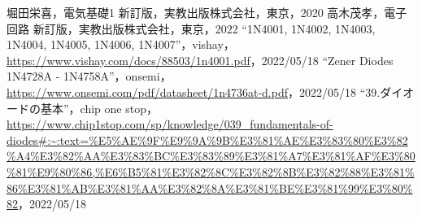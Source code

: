 \begin{thebibliography}{9}%
	 堀田栄喜，電気基礎1 新訂版，実教出版株式会社，東京，2020
	 高木茂孝，電子回路 新訂版，実教出版株式会社，東京，2022
	 ``1N4001, 1N4002, 1N4003, 1N4004, 1N4005, 1N4006, 1N4007''，vishay，\url{https://www.vishay.com/docs/88503/1n4001.pdf}，2022/05/18
	 ``Zener Diodes 1N4728A - 1N4758A''，onsemi，\url{https://www.onsemi.com/pdf/datasheet/1n4736at-d.pdf}，2022/05/18
	 ``39.ダイオードの基本''，chip one stop，\url{https://www.chip1stop.com/sp/knowledge/039_fundamentals-of-diodes#:~:text=%E5%AE%9F%E9%9A%9B%E3%81%AE%E3%83%80%E3%82%A4%E3%82%AA%E3%83%BC%E3%83%89%E3%81%A7%E3%81%AF%E3%80%81%E9%80%86,%E6%B5%81%E3%82%8C%E3%82%8B%E3%82%88%E3%81%86%E3%81%AB%E3%81%AA%E3%82%8A%E3%81%BE%E3%81%99%E3%80%82}，2022/05/18
\end{thebibliography}